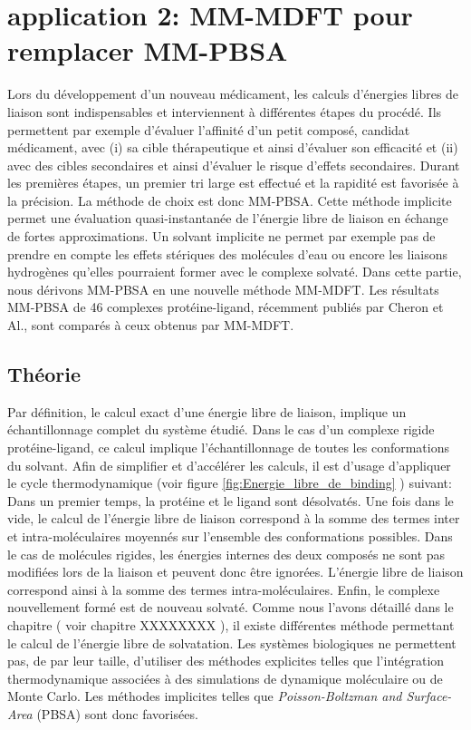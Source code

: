 \clearpage
\section{application 2: MM-MDFT pour remplacer MM-PBSA}
Lors du développement d'un nouveau médicament, les calculs d'énergies libres de liaison sont indispensables et interviennent à différentes étapes du procédé. Ils permettent par exemple d'évaluer l'affinité d'un petit composé, candidat médicament, avec (i) sa cible thérapeutique et ainsi d'évaluer son efficacité et (ii) avec des cibles secondaires et ainsi d'évaluer le risque d'effets secondaires. Durant les premières étapes, un premier tri large est effectué et la rapidité est favorisée à la précision. La méthode de choix est donc MM-PBSA\cite{genheden_mm/pbsa_2015}. Cette méthode implicite permet une évaluation quasi-instantanée de l'énergie libre de liaison en échange de fortes approximations. Un solvant implicite ne permet par exemple pas de prendre en compte les effets stériques des molécules d'eau ou encore les liaisons hydrogènes qu'elles pourraient former avec le complexe solvaté. Dans cette partie, nous dérivons MM-PBSA en une nouvelle méthode MM-MDFT. Les résultats MM-PBSA de 46 complexes protéine-ligand, récemment publiés par Cheron et Al.\cite{cheron_effect_2017}, sont comparés à ceux obtenus par MM-MDFT.

\subsection{Théorie}
Par définition, le calcul exact d'une énergie libre de liaison, implique un échantillonnage complet du système étudié. Dans le cas d'un complexe rigide protéine-ligand, ce calcul implique l'échantillonnage de toutes les conformations du solvant. Afin de simplifier et d’accélérer les calculs, il est d'usage d'appliquer le cycle thermodynamique (voir figure \ref{fig:Energie_libre_de_binding} ) suivant: Dans un premier temps, la protéine et le ligand sont désolvatés. Une fois dans le vide, le calcul de l'énergie libre de liaison correspond à la somme des termes inter et intra-moléculaires moyennés sur l'ensemble des conformations possibles. Dans le cas de molécules rigides, les énergies internes des deux composés ne sont pas modifiées lors de la liaison et peuvent donc être ignorées. L'énergie libre de liaison correspond ainsi à la somme des termes intra-moléculaires. Enfin, le complexe nouvellement formé est de nouveau solvaté. Comme nous l'avons détaillé dans le chapitre ( voir chapitre XXXXXXXX ), il existe différentes méthode permettant le calcul de l'énergie libre de solvatation. Les systèmes biologiques ne permettent pas, de par leur taille, d'utiliser des méthodes explicites telles que l'intégration thermodynamique associées à des simulations de dynamique moléculaire ou de Monte Carlo. Les méthodes implicites telles que \textit{Poisson-Boltzman and Surface-Area} (PBSA) sont donc favorisées.



